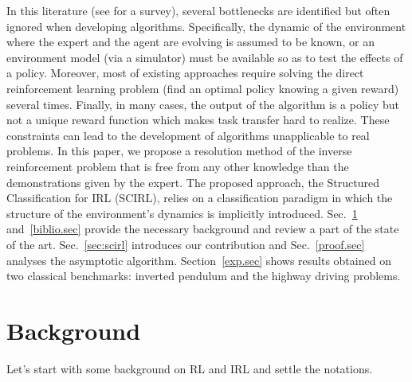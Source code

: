 \documentclass{article}
\begin{document}
In this literature (see \cite{neu2009training} for a survey),
several bottlenecks are identified but often ignored when developing
algorithms. Specifically, the dynamic of the environment where the
expert and the agent are evolving is assumed to be known, or an
environment model (via a simulator) must be available so as to test
the effects of a policy. Moreover, most of existing approaches
require solving the direct reinforcement learning problem (find an
optimal policy knowing a given reward) several times. Finally, in
many cases, the output of the algorithm is a policy but not a unique
reward function which makes task transfer hard to realize. These
constraints can lead to the development of algorithms unapplicable
to real problems.
%
In this paper, we propose a resolution method of the inverse
reinforcement problem that is free from any other knowledge than the
demonstrations given by the expert. The proposed approach, the
Structured Classification for IRL (SCIRL), relies on a
classification paradigm in which the structure of the environment's
dynamics is implicitly introduced. Sec.~\ref{back.sec}
and~\ref{biblio.sec} provide the necessary background and review a
part of the state of the art. Sec.~\ref{sec:scirl} introduces our
contribution and Sec.~\ref{proof.sec} analyses the asymptotic
algorithm. Section~\ref{exp.sec} shows results obtained on two
classical benchmarks: inverted pendulum and the highway driving
problems.
%


\section{Background}
\label{back.sec}
Let's start with some background on RL and IRL and settle the
notations.
\end{document}
